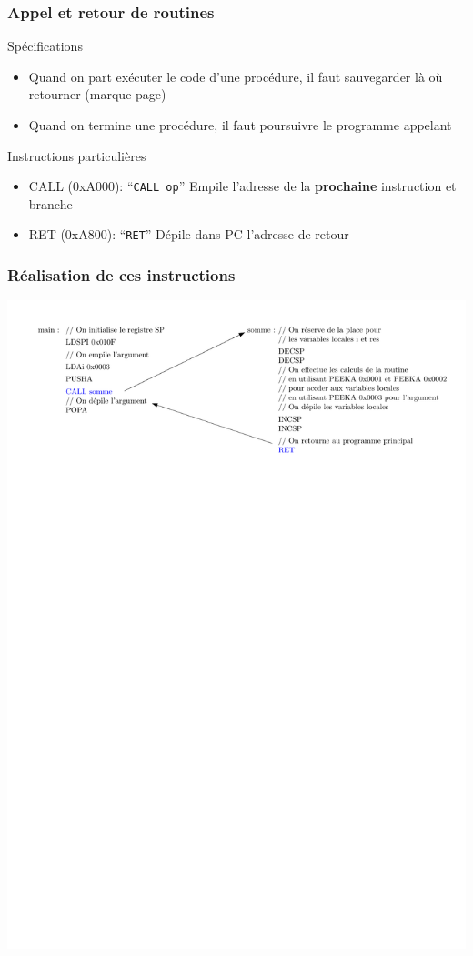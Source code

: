 \documentclass{beamer}
\begin{document}
\begin{frame}
\frametitle{Appel et retour de routines}

\begin{block}{Spécifications}
\begin{itemize}
\item Quand on part exécuter le code d'une procédure, il faut sauvegarder là o{\`u} retourner (marque page)
\item Quand on termine une procédure, il faut poursuivre le programme appelant
\end{itemize}
\end{block}
\begin{block}{Instructions particulières}
\begin{itemize}
\item CALL (0xA000): ``\texttt{CALL op}'' Empile l'adresse de la \textbf{prochaine} instruction et branche
\item RET (0xA800): ``\texttt{RET}'' Dépile dans PC l'adresse de retour
\end{itemize}
\end{block}
\end{frame}


\begin{frame}
\frametitle{Réalisation de ces instructions}
\includegraphics[width=\linewidth]{Figs/stack_args_ret.pdf}
\end{frame}
\end{document}
